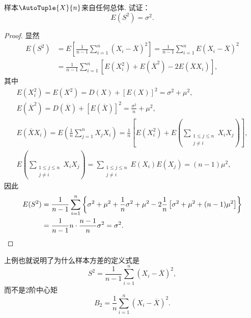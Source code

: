 
\begin{example}
样本\(\AutoTuple{X}{n}\)来自任何总体.
试证：\begin{equation}
	E(S^2) = \sigma^2.
\end{equation}
\begin{proof}
显然\begin{align*}
	E(S^2)
	&= E\left[\frac{1}{n-1} \sum_{i=1}^n (X_i-\overline{X})^2\right]
	= \frac{1}{n-1} \sum_{i=1}^n E(X_i-\overline{X})^2 \\
	&= \frac{1}{n-1} \sum_{i=1}^n \left[ E(X_i^2) + E(\overline{X}^2) - 2 E(\overline{X} X_i) \right],
\end{align*}
其中\begin{gather*}
	E(X_i^2) = E(X^2) = D(X) + [E(X)]^2 = \sigma^2 + \mu^2, \\
	E(\overline{X}^2)
	= D(\overline{X}) + [E(\overline{X})]^2
	= \frac{\sigma^2}{n} + \mu^2, \\
	E(\overline{X} X_i)
	= E\left(\frac1n \sum_{j=1}^n X_j X_i\right)
	= \frac1n \left[ E(X_i^2) + E\left(\sum_{\substack{1 \leq j \leq n \\ j \neq i}} X_i X_j\right) \right], \\
	E\left(\sum_{\substack{1 \leq j \leq n \\ j \neq i}} X_i X_j\right)
	= \sum_{\substack{1 \leq j \leq n \\ j \neq i}} E(X_i) E(X_j)
	= (n-1) \mu^2,
\end{gather*}
因此\begin{align*}
	E(S^2) &= \frac{1}{n-1} \sum_{i=1}^n \left\{
			\sigma^2 + \mu^2
			+ \frac1n \sigma^2 + \mu^2
			- 2 \frac1n \left[ \sigma^2 + \mu^2 + (n-1)\mu^2 \right]
		\right\} \\
	&= \frac{1}{n-1} n \cdot \frac{n-1}{n} \sigma^2
	= \sigma^2.
	\qedhere
\end{align*}
\end{proof}
\end{example}
上例也就说明了为什么样本方差的定义式是\[
	S^2 = \frac{1}{n-1} \sum_{i=1}^n (X_i-\overline{X})^2,
\]
而不是2阶中心矩\[
	B_2 = \frac1n \sum_{i=1}^n (X_i-\overline{X})^2.
\]

